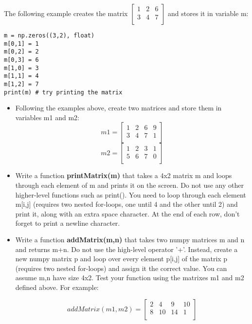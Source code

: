 \documentclass[11pt,a4paper]{report}
\begin{document}
The following example creates the matrix $\left[ {\begin{array}{cccc}
   1 & 2 & 6\\     
   3 & 4 & 7\\
   \end{array} } \right]$ and stores it in variable m:
   
\begin{lstlisting}
m = np.zeros((3,2), float)
m[0,1] = 1
m[0,2] = 2
m[0,3] = 6
m[1,0] = 3
m[1,1] = 4
m[1,2] = 7
print(m) # try printing the matrix
\end{lstlisting}


\begin{itemize}
 \item Following the examples above, create two matrices and store them in variables m1 and m2:
   \[ m1= \left[ {\begin{array}{cccc}
   1 & 2 & 6 & 9\\     
   3 & 4 & 7 & 1\\
   \end{array} } \right]
\]
   \[ m2= \left[ {\begin{array}{cccc}
   1 & 2 & 3 & 1\\     
   5 & 6 & 7 & 0\\
   \end{array} } \right]
\]

 \item Write a function \textbf{printMatrix(m)} that takes a 4x2 matrix m and loops through each element of m and prints it on the screen. Do not use any other higher-level functions such as print(). You need to loop through each element m[i,j] (requires two nested for-loops, one until 4 and the other until 2) and print it, along with an extra space character. At the end of each row, don't forget to print a newline character. 
 
 \item Write a function \textbf{addMatrix(m,n)} that takes two numpy matrices m and n and returns m+n. Do not use the high-level operator '+'. Instead, create a new numpy matrix p and loop over every element p[i,j] of the matrix p (requires two nested for-loops) and assign it the correct value. You can assume m,n have size 4x2.
 Test your function using the matrixes m1 and m2 defined above. For example:
 
 $$ addMatrix(m1,m2) = \left[ {\begin{array}{cccc}
   2 & 4 & 9 & 10\\     
   8 & 10 & 14 & 1\\
   \end{array} } \right] $$
 

\end{itemize}
\end{document}
